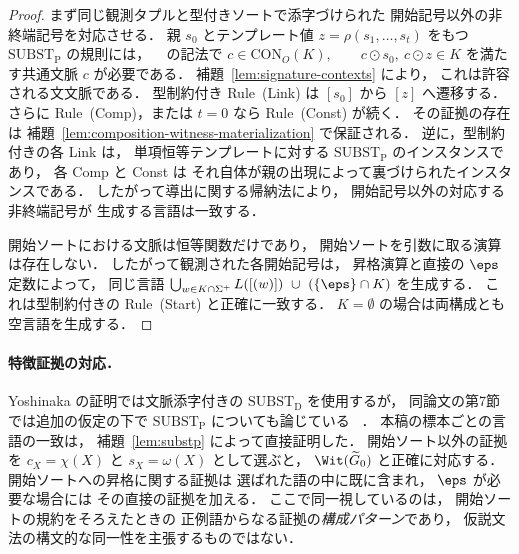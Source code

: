 \begin{proof}
まず同じ観測タプルと型付きソートで添字づけられた
開始記号以外の非終端記号を対応させる．
親 $s_0$ とテンプレート値
$z=\rho(s_1,\ldots,s_t)$ をもつ
$\mathrm{SUBST}_{\mathrm P}$ の規則には，
~\cite{Yoshinaka2015General} の記法で
\(c\in\mathrm{CON}_O(K),\qquad c\odot s_0,\ c\odot z\in K\)
を満たす共通文脈 $c$ が必要である．
補題~\ref{lem:signature-contexts} により，
これは許容される文文脈である．
型制約付き Rule~(Link) は
$[s_0]$ から $[z]$ へ遷移する．
さらに Rule~(Comp)，または $t=0$ なら
Rule~(Const) が続く．
その証拠の存在は
補題~\ref{lem:composition-witness-materialization}
で保証される．
逆に，型制約付きの各 Link は，
単項恒等テンプレートに対する
$\mathrm{SUBST}_{\mathrm P}$ のインスタンスであり，
各 Comp と Const は
それ自体が親の出現によって裏づけられたインスタンスである．
したがって導出に関する帰納法により，
開始記号以外の対応する非終端記号が
生成する言語は一致する．

開始ソートにおける文脈は恒等関数だけであり，
開始ソートを引数に取る演算は存在しない．
したがって観測された各開始記号は，
昇格演算と直接の $\eps$ 定数によって，
同じ言語
\(\bigcup_{w\in K\cap\Sigma^+}L([(w)]) \ \cup\ (\{\eps\}\cap K)\)
を生成する．
これは型制約付きの Rule~(Start) と正確に一致する．
$K=\emptyset$ の場合は両構成とも空言語を生成する．
\end{proof}

\paragraph{特徴証拠の対応．}
Yoshinaka の証明では文脈添字付きの
$\mathrm{SUBST}_{\mathrm D}$ を使用するが，
同論文の第7節では追加の仮定の下で
$\mathrm{SUBST}_{\mathrm P}$ についても論じている
~\cite{Yoshinaka2015General}．
本稿の標本ごとの言語の一致は，
補題~\ref{lem:substp} によって直接証明した．
開始ソート以外の証拠を
$c_X=\chi(X)$ と $s_X=\omega(X)$
として選ぶと，
$\Wit(\widetilde G_0)$ と正確に対応する．
開始ソートへの昇格に関する証拠は
選ばれた語の中に既に含まれ，
$\eps$ が必要な場合には
その直接の証拠を加える．
ここで同一視しているのは，
開始ソートの規約をそろえたときの
正例語からなる証拠の\emph{構成パターン}であり，
仮説文法の構文的な同一性を主張するものではない．


